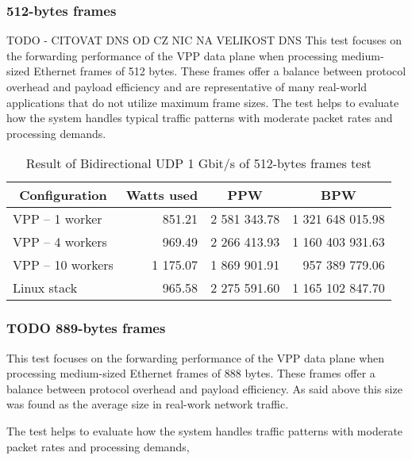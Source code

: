 \subsubsection{512-bytes frames}
TODO - CITOVAT DNS OD CZ NIC NA VELIKOST DNS
This test focuses on the forwarding performance of the VPP data plane when processing medium-sized Ethernet frames of 512 bytes. 
These frames offer a balance between protocol overhead and payload efficiency and are representative of many real-world applications that do not utilize maximum frame sizes. 
The test helps to evaluate how the system handles typical traffic patterns with moderate packet rates and processing demands.

\begin{table}[h!]
\centering
\begin{tabular}{|l|r|r|r|}
\hline
\multicolumn{1}{|c|}{\textbf{Configuration}} &
\multicolumn{1}{c|}{\textbf{Watts used}} &
\multicolumn{1}{c|}{\textbf{PPW}} &
\multicolumn{1}{c|}{\textbf{BPW}} \\
\hline
VPP -- 1 worker & 851.21 & 2 581 343.78 & 1 321 648 015.98 \\
VPP -- 4 workers & 969.49 & 2 266 413.93 & 1 160 403 931.63 \\
VPP -- 10 workers & 1 175.07 & 1 869 901.91 & 957 389 779.06 \\
Linux stack & 965.58 & 2 275 591.60 & 1 165 102 847.70 \\
\hline
\end{tabular}
\caption{Result of Bidirectional UDP 1 Gbit/s of 512-bytes frames test}
\label{tab:udp:two}
\end{table}

\subsubsection{TODO 889-bytes frames}

This test focuses on the forwarding performance of the VPP data plane when processing medium-sized Ethernet frames of 888 bytes. 
These frames offer a balance between protocol overhead and payload efficiency. As said above this size was found as the average size in real-work network traffic.

The test helps to evaluate how the system handles traffic patterns with moderate packet rates and processing demands, 


